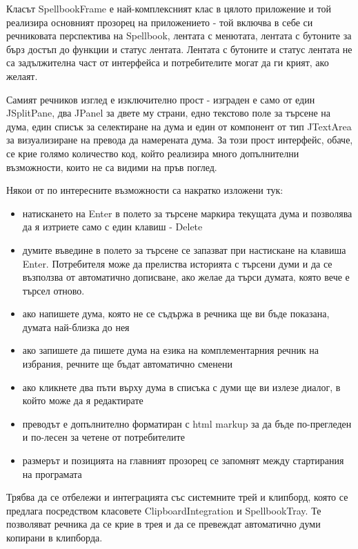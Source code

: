 \begin{itemize}
    Класът SpellbookFrame е най-комплексният клас в цялото приложение
    и той реализира основният прозорец на приложението - той включва в
    себе си речниковата перспектива на Spellbook, лентата с менютата,
    лентата с бутоните за бърз достъп до функции и статус
    лентата. Лентата с бутоните и статус лентата не са задължителна
    част от интерфейса и потребителите могат да ги крият, ако желаят. 

    Самият речников изглед е изключително прост - изграден е само от
    един JSplitPane, два JPanel за двете му страни, едно текстово поле
    за търсене на дума, един списък за селектиране на дума и един от
    компонент от тип JTextArea за визуализиране на превода да
    намерената дума. За този прост интерфейс, обаче, се крие голямо
    количество код, който реализира много допълнителни възможности,
    които не са видими на пръв поглед. 

    Някои от по интересните възможности са накратко изложени тук:
    
    \begin{itemize}
      \item натискането на Enter в полето за търсене маркира текущата
        дума и позволява да я изтриете само с един клавиш - Delete
      \item думите въведине в полето за търсене се запазват при
        настискане на клавиша Enter. Потребителя може да прелиства
        историята с търсени думи и да се възползва от автоматично
        дописване, ако желае да търси думата, която вече е търсел
        отново.
     \item ако напишете дума, която не се съдържа в речника ще ви бъде
       показана, думата най-близка до нея
     \item ако запишете да пишете дума на езика на комплементарния
       речник на избрания, речните ще бъдат автоматично сменени
     \item ако кликнете два пъти върху дума в списъка с думи ще ви
       излезе диалог, в който може да я редактирате
     \item преводът е допълнително форматиран с html markup за да бъде
       по-прегледен и по-лесен за четене от потребителите
     \item размерът и позицията на главният прозорец се запомнят между
       стартирания на програмата
    \end{itemize}

    Трябва да се отбележи и интеграцията със системните трей и
    клипборд, която се предлага посредством класовете
    ClipboardIntegration и SpellbookTray. Те позволяват речника да се
    крие в трея и да се превеждат автоматично думи копирани в
    клипборда.


\end{itemize}
